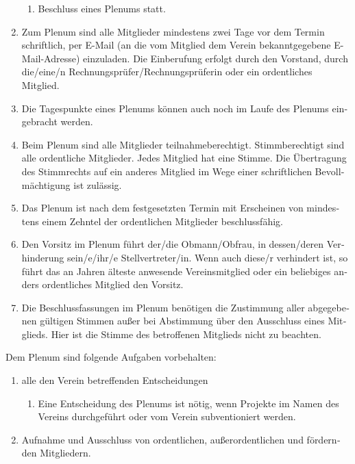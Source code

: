 \begin{otherlanguage}{german}
\begin{enumerate}[statutenenum]
\begin{enumerate}[statutenenum]
            \item Beschluss eines Plenums statt.
        \end{enumerate}

    \item Zum Plenum sind alle Mitglieder mindestens zwei Tage vor dem Termin schriftlich, per E-Mail (an die vom Mitglied dem Verein bekanntgegebene E-Mail-Adresse) einzuladen.
        Die Einberufung erfolgt durch den Vorstand, durch die/eine/n Rechnungsprüfer/Rechnungsprüferin oder ein ordentliches Mitglied.

    \item Die Tagespunkte eines Plenums können auch noch im Laufe des Plenums eingebracht werden.

    \item Beim Plenum sind alle Mitglieder teilnahmeberechtigt.
        Stimmberechtigt sind alle ordentliche Mitglieder.
        Jedes Mitglied hat eine Stimme.
        Die Übertragung des Stimmrechts auf ein anderes Mitglied im Wege einer schriftlichen Bevollmächtigung ist zulässig.

    \item Das Plenum ist nach dem festgesetzten Termin mit Erscheinen von mindestens einem Zehntel der ordentlichen Mitglieder beschlussfähig.

    \item Den Vorsitz im Plenum führt der/die Obmann/Obfrau, in dessen/deren Verhinderung sein/e/ihr/e Stellvertreter/in.
        Wenn auch diese/r verhindert ist, so führt das an Jahren älteste anwesende Vereinsmitglied oder ein beliebiges anders ordentliches Mitglied den Vorsitz.

    \item Die Beschlussfassungen im Plenum benötigen die Zustimmung aller abgegebenen gültigen Stimmen außer bei Abstimmung über den Ausschluss eines Mitglieds. Hier ist die Stimme des betroffenen Mitglieds nicht zu beachten.
\end{enumerate}


Dem Plenum sind folgende Aufgaben vorbehalten:

\begin{enumerate}[statutenenum]
    \item alle den Verein betreffenden Entscheidungen
        \begin{enumerate}[statutenenum]
            \item Eine Entscheidung des Plenums ist nötig, wenn Projekte im Namen des Vereins durchgeführt oder vom Verein subventioniert werden.
        \end{enumerate}
    \item Aufnahme und Ausschluss von ordentlichen, außerordentlichen und fördernden Mitgliedern.
\end{enumerate}


\end{otherlanguage}
